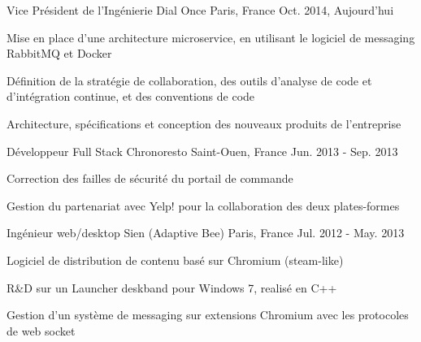 

\begin{cventries}

  \cventry
    {Vice Président de l'Ingénierie} %
    {Dial Once} %
    {Paris, France} %
    {Oct. 2014, Aujourd'hui} %
    {
      \begin{cvitems} %
        \item {Mise en place d'une architecture microservice, en utilisant le logiciel de messaging RabbitMQ et Docker}
        \item {Définition de la stratégie de collaboration, des outils d'analyse de code et d'intégration continue, et des conventions de code}
        \item {Architecture, spécifications et conception des nouveaux produits de l'entreprise}
      \end{cvitems}
    }

  \cventry
    {Développeur Full Stack} %
    {Chronoresto} %
    {Saint-Ouen, France} %
    {Jun. 2013 - Sep. 2013} %
    {
      \begin{cvitems} %
        \item {Correction des failles de sécurité du portail de commande}
        \item {Gestion du partenariat avec Yelp! pour la collaboration des deux plates-formes}
      \end{cvitems}
    }

  \cventry
    {Ingénieur web/desktop} %
    {Sien (Adaptive Bee)} %
    {Paris, France} %
    {Jul. 2012 - May. 2013} %
    {
      \begin{cvitems} %
        \item {Logiciel de distribution de contenu basé sur Chromium (steam-like)}
        \item {R\&D sur un Launcher deskband pour Windows 7, realisé en C++ }
        \item {Gestion d'un système de messaging sur extensions Chromium avec les protocoles de web socket}
      \end{cvitems}
    }


\end{cventries}
